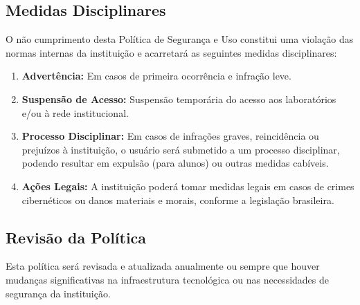 \documentclass[12pt]{article}
\begin{document}
\subsection{Medidas Disciplinares}

O não cumprimento desta Política de Segurança e Uso constitui uma violação das normas internas da instituição e acarretará as seguintes medidas disciplinares:
\begin{enumerate}
    \item \textbf{Advertência:} Em casos de primeira ocorrência e infração leve.
    \item \textbf{Suspensão de Acesso:} Suspensão temporária do acesso aos laboratórios e/ou à rede institucional.
    \item \textbf{Processo Disciplinar:} Em casos de infrações graves, reincidência ou prejuízos à instituição, o usuário será submetido a um processo disciplinar, podendo resultar em expulsão (para alunos) ou outras medidas cabíveis.
    \item \textbf{Ações Legais:} A instituição poderá tomar medidas legais em casos de crimes cibernéticos ou danos materiais e morais, conforme a legislação brasileira.
\end{enumerate}

\subsection{Revisão da Política}

Esta política será revisada e atualizada anualmente ou sempre que houver mudanças significativas na infraestrutura tecnológica ou nas necessidades de segurança da instituição.
\end{document}
